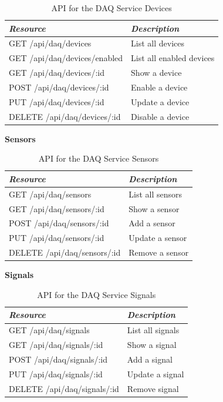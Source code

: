       \begin{table}[H]
        \centering
        \begin{tabular}{p{3in} p{3in}}
          \toprule
          \emph{Resource} & \emph{Description} \\ [0.5ex]
          \midrule
          GET /api/daq/devices & List all devices \\
          GET /api/daq/devices/enabled & List all enabled devices \\
          GET /api/daq/devices/:id & Show a device \\
          POST /api/daq/devices/:id & Enable a device \\
          PUT /api/daq/devices/:id & Update a device \\
          DELETE /api/daq/devices/:id & Disable a device \\
          \bottomrule
        \end{tabular}
        \caption{API for the DAQ Service Devices}\label{tab:rest-daq-dev}
      \end{table}

      \large{\textbf{Sensors}}

      \begin{table}[H]
        \centering
        \begin{tabular}{p{3in} p{3in}}
          \toprule
          \emph{Resource} & \emph{Description} \\ [0.5ex]
          \midrule
          GET /api/daq/sensors & List all sensors \\
          GET /api/daq/sensors/:id & Show a sensor \\
          POST /api/daq/sensors/:id & Add a sensor \\
          PUT /api/daq/sensors/:id & Update a sensor \\
          DELETE /api/daq/sensors/:id & Remove a sensor \\
          \bottomrule
        \end{tabular}
        \caption{API for the DAQ Service Sensors}\label{tab:rest-daq-sensor}
      \end{table}

      \large{\textbf{Signals}}

      \begin{table}[H]
        \centering
        \begin{tabular}{p{3in} p{3in}}
          \toprule
          \emph{Resource} & \emph{Description} \\ [0.5ex]
          \midrule
          GET /api/daq/signals & List all signals \\
          GET /api/daq/signals/:id & Show a signal \\
          POST /api/daq/signals/:id & Add a signal \\
          PUT /api/daq/signals/:id & Update a signal \\
          DELETE /api/daq/signals/:id & Remove signal \\
          \bottomrule
        \end{tabular}
        \caption{API for the DAQ Service Signals}\label{tab:rest-daq-signal}
      \end{table}

